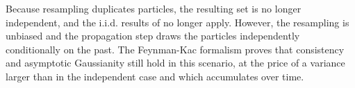\begin{algorithm}[H]
	\begin{algorithmic}
	\EndWhile
	\EndFor
	\end{algorithmic}\caption{Kitagawa Resampling}\label{alg:Kitagawa}
\end{algorithm}

\begin{remark}\label{th:loss_independence}
	Because resampling duplicates particles, the resulting set is no longer independent, and the i.i.d. results of  no longer apply. However, the resampling is unbiased and the propagation step draws the particles independently conditionally on the past. The Feynman-Kac formalism proves that consistency and asymptotic Gaussianity still hold in this scenario, at the price of a variance larger than in the independent case and which accumulates over time.
\end{remark}
